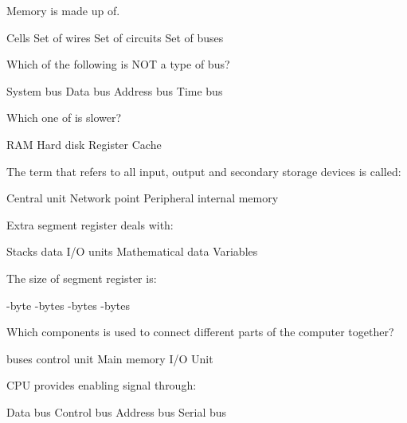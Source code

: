 \documentclass{exam}
\begin{document}
\begin{questions}
Memory is made up of.\\
\begin{oneparchoices}
\choice Cells
\choice Set of wires
\choice Set of circuits
\choice Set of buses
\end{oneparchoices}
\question 

Which of the following is NOT a type of bus?\\
\begin{oneparchoices}
\choice System bus
\choice Data bus
\choice Address bus
\choice Time bus
\end{oneparchoices}
\question 

Which one of is slower?\\
\begin{oneparchoices}
\choice RAM
\choice Hard disk
\choice Register
\choice Cache
\end{oneparchoices}
\question 

The term that refers to all input, output and secondary storage devices is called:\\
\begin{oneparchoices}
\choice Central unit
\choice Network point
\choice Peripheral
\choice internal memory
\end{oneparchoices}
\question 

Extra segment register deals with:\\
\begin{oneparchoices}
\choice Stacks data
\choice I/O units
\choice Mathematical data
\choice Variables
\end{oneparchoices}
\question 

The size of segment register is:\\
\begin{oneparchoices}
-byte
-bytes
-bytes
-bytes
\end{oneparchoices}
\question 

Which components is used to connect different parts of the computer together?\\
\begin{oneparchoices}
\choice buses
\choice control unit
\choice Main memory
\choice I/O Unit
\end{oneparchoices}
\question 

CPU provides enabling signal through:\\
\begin{oneparchoices}
\choice Data bus
\choice Control bus
\choice Address bus
\choice Serial bus
\end{oneparchoices}
\question 


\end{questions}
\end{document}
